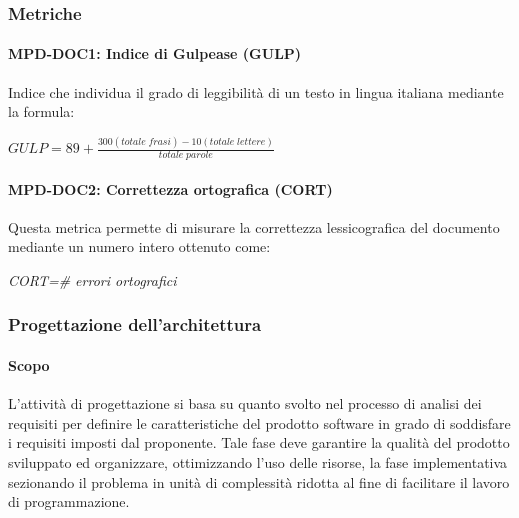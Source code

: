\subsubsection{Metriche}

\paragraph{MPD-DOC1: Indice di Gulpease (GULP)}
Indice che individua il grado di leggibilità di un testo in lingua italiana mediante la formula:
\begin{center}
    \(GULP=89+\frac{300(totale\; frasi)-10(totale\; lettere)}{totale\; parole}\)
\end{center}

\paragraph{MPD-DOC2: Correttezza ortografica (CORT)}
Questa metrica permette di misurare la correttezza lessicografica del documento mediante un numero intero ottenuto come:
\begin{center}
    \textit{CORT=\# errori ortografici}
\end{center}




\subsubsection{Progettazione dell'architettura}
\paragraph{Scopo}
L'attività di progettazione si basa su quanto svolto nel processo di analisi dei requisiti per definire le caratteristiche del prodotto software in grado di soddisfare i requisiti imposti dal proponente.  Tale fase deve garantire la qualità del prodotto sviluppato ed organizzare, ottimizzando l'uso delle risorse, la fase implementativa sezionando il problema in unità di complessità ridotta al fine di facilitare il lavoro di programmazione.

